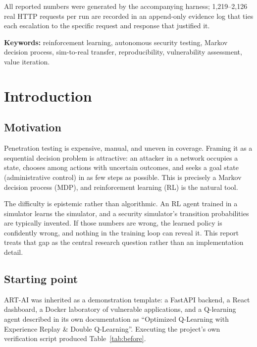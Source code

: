 \documentclass[11pt,a4paper]{report}
\begin{document}
All reported numbers were generated by the accompanying harness; 1{,}219--2{,}126
real HTTP requests per run are recorded in an append-only evidence log that ties
each escalation to the specific request and response that justified it.

\vspace{0.4cm}
\noindent\textbf{Keywords:} reinforcement learning, autonomous security testing,
Markov decision process, sim-to-real transfer, reproducibility, vulnerability
assessment, value iteration.

\tableofcontents
\listoffigures
\listoftables

\chapter{Introduction}

\section{Motivation}
Penetration testing is expensive, manual, and uneven in coverage. Framing it as
a sequential decision problem is attractive: an attacker in a network occupies a
state, chooses among actions with uncertain outcomes, and seeks a goal state
(administrative control) in as few steps as possible. This is precisely a Markov
decision process (MDP), and reinforcement learning (RL) is the natural tool.

The difficulty is epistemic rather than algorithmic. An RL agent trained in a
simulator learns the simulator, and a security simulator's transition
probabilities are typically invented. If those numbers are wrong, the learned
policy is confidently wrong, and nothing in the training loop can reveal it.
This report treats that gap as the central research question rather than an
implementation detail.

\section{Starting point}
ART-AI was inherited as a demonstration template: a FastAPI backend, a React
dashboard, a Docker laboratory of vulnerable applications, and a Q-learning
agent described in its own documentation as ``Optimized Q-Learning with
Experience Replay \& Double Q-Learning''. Executing the project's own
verification script produced Table~\ref{tab:before}.
\end{document}
